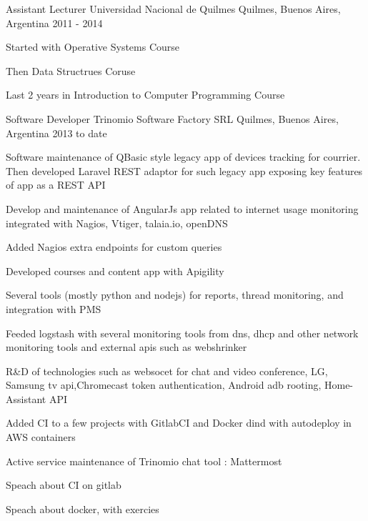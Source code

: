 

\begin{cventries}

  \cventry
    {Assistant Lecturer} %
    {Universidad Nacional de Quilmes} %
    {Quilmes, Buenos Aires, Argentina} %
    {2011 - 2014} %
    {
      \begin{cvitems} %
        \item {Started with Operative Systems Course}
        \item {Then Data Structrues Coruse}
        \item {Last 2 years in Introduction to Computer Programming Course}
      \end{cvitems}
    }

  \cventry
    {Software Developer} %
    {Trinomio Software Factory SRL} %
    {Quilmes, Buenos Aires, Argentina} %
    {2013 to date} %
    {
      \begin{cvitems} %
        \item {Software maintenance of QBasic style legacy app of devices tracking for courrier. Then developed Laravel REST adaptor for such legacy app exposing key features of app as a REST API}
        \item {Develop and maintenance of AngularJs app related to internet usage monitoring integrated with Nagios, Vtiger, talaia.io, openDNS }
        \item {Added Nagios extra endpoints for custom queries}
        \item {Developed courses and content app with Apigility}
        \item {Several tools (mostly python and nodejs) for reports, thread monitoring, and integration with PMS }
        \item { Feeded logstash with several monitoring tools from dns, dhcp and other network monitoring tools and external apis such as webshrinker }
        \item {R\&D of technologies such as websocet for chat and video conference, LG, Samsung tv api,Chromecast token authentication, Android adb rooting, Home-Assistant API }
        \item {Added CI to a few projects with GitlabCI and Docker dind with autodeploy in AWS containers}
        \item {Active service maintenance of Trinomio chat tool : Mattermost }
        \item { Speach about CI on gitlab }
        \item { Speach about docker, with exercies }
      \end{cvitems}
    }

\end{cventries}
